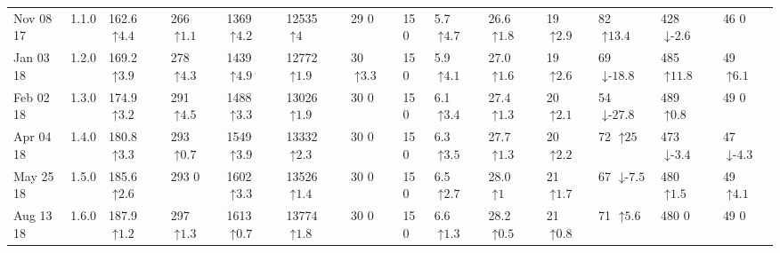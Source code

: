 \begin{tabular}{ll|llllll|lll|lll}
Nov 08 17 & 1.1.0 & 162.6 {\tiny $\uparrow\text{4.4}$} & 266 {\tiny $\uparrow\text{1.1}$} & 1369 {\tiny $\uparrow\text{4.2}$} & 12535 {\tiny $\uparrow\text{4}$} & 29 {\tiny $\text{0}$} & 15 {\tiny $\text{0}$} & 5.7 {\tiny $\uparrow\text{4.7}$} & 26.6 {\tiny $\uparrow\text{1.8}$} & 19 {\tiny $\uparrow\text{2.9}$} & 82 {\tiny $\uparrow\text{13.4}$} & 428 {\tiny $\downarrow\text{-}\text{2.6}$} & 46 {\tiny $\text{0}$} \\
Jan 03 18 & 1.2.0 & 169.2 {\tiny $\uparrow\text{3.9}$} & 278 {\tiny $\uparrow\text{4.3}$} & 1439 {\tiny $\uparrow\text{4.9}$} & 12772 {\tiny $\uparrow\text{1.9}$} & 30 {\tiny $\uparrow\text{3.3}$} & 15 {\tiny $\text{0}$} & 5.9 {\tiny $\uparrow\text{4.1}$} & 27.0 {\tiny $\uparrow\text{1.6}$} & 19 {\tiny $\uparrow\text{2.6}$} & 69 {\tiny $\downarrow\text{-}\text{18.8}$} & 485 {\tiny $\uparrow\text{11.8}$} & 49 {\tiny $\uparrow\text{6.1}$} \\
Feb 02 18 & 1.3.0 & 174.9 {\tiny $\uparrow\text{3.2}$} & 291 {\tiny $\uparrow\text{4.5}$} & 1488 {\tiny $\uparrow\text{3.3}$} & 13026 {\tiny $\uparrow\text{1.9}$} & 30 {\tiny $\text{0}$} & 15 {\tiny $\text{0}$} & 6.1 {\tiny $\uparrow\text{3.4}$} & 27.4 {\tiny $\uparrow\text{1.3}$} & 20 {\tiny $\uparrow\text{2.1}$} & 54 {\tiny $\downarrow\text{-}\text{27.8}$} & 489 {\tiny $\uparrow\text{0.8}$} & 49 {\tiny $\text{0}$} \\
Apr 04 18 & 1.4.0 & 180.8 {\tiny $\uparrow\text{3.3}$} & 293 {\tiny $\uparrow\text{0.7}$} & 1549 {\tiny $\uparrow\text{3.9}$} & 13332 {\tiny $\uparrow\text{2.3}$} & 30 {\tiny $\text{0}$} & 15 {\tiny $\text{0}$} & 6.3 {\tiny $\uparrow\text{3.5}$} & 27.7 {\tiny $\uparrow\text{1.3}$} & 20 {\tiny $\uparrow\text{2.2}$} & 72 {\tiny $\uparrow\text{25}$} & 473 {\tiny $\downarrow\text{-}\text{3.4}$} & 47 {\tiny $\downarrow\text{-}\text{4.3}$} \\
May 25 18 & 1.5.0 & 185.6 {\tiny $\uparrow\text{2.6}$} & 293 {\tiny $\text{0}$} & 1602 {\tiny $\uparrow\text{3.3}$} & 13526 {\tiny $\uparrow\text{1.4}$} & 30 {\tiny $\text{0}$} & 15 {\tiny $\text{0}$} & 6.5 {\tiny $\uparrow\text{2.7}$} & 28.0 {\tiny $\uparrow\text{1}$} & 21 {\tiny $\uparrow\text{1.7}$} & 67 {\tiny $\downarrow\text{-}\text{7.5}$} & 480 {\tiny $\uparrow\text{1.5}$} & 49 {\tiny $\uparrow\text{4.1}$} \\
Aug 13 18 & 1.6.0 & 187.9 {\tiny $\uparrow\text{1.2}$} & 297 {\tiny $\uparrow\text{1.3}$} & 1613 {\tiny $\uparrow\text{0.7}$} & 13774 {\tiny $\uparrow\text{1.8}$} & 30 {\tiny $\text{0}$} & 15 {\tiny $\text{0}$} & 6.6 {\tiny $\uparrow\text{1.3}$} & 28.2 {\tiny $\uparrow\text{0.5}$} & 21 {\tiny $\uparrow\text{0.8}$} & 71 {\tiny $\uparrow\text{5.6}$} & 480 {\tiny $\text{0}$} & 49 {\tiny $\text{0}$} \\

\end{tabular}
